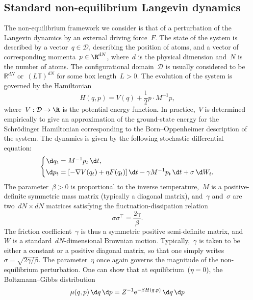 \subsection{Standard non-equilibrium Langevin dynamics}\label{04:subsec:langevin_nemd}
The non-equilibrium framework we consider is that of a perturbation of the Langevin dynamics by an external driving force~$F$. 
The state of the system is described by a vector~$q\in \mathcal D$, describing the position of atoms, and a vector of corresponding momenta~$p\in \R^{dN}$, where~$d$ is the physical dimension and~$N$ is the number of atoms.
The configurational domain~$\mathcal D$ is usually considered to be~$\mathbb{R}^{dN}$ or~$(L\mathbb{T})^{dN}$ for some box length~$L>0$. The evolution of the system is governed by the Hamiltonian \[H(q,p) = V(q) +\frac12 p\cdot M^{-1}p,\]
where~$V:\mathcal D \to \R$ is the potential energy function. In practice,~$V$ is determined empirically to give an approximation of the ground-state energy for the Schr\"odinger Hamiltonian corresponding to the Born--Oppenheimer description of the system.
The dynamics is given by the following stochastic differential equation:
\begin{equation}
    \label{04:eq:langevin_equation}
    \left\{\begin{aligned}
    \d q_t & = M^{-1}p_t\, \d t, \\
    \d p_t &= \left[ -\nabla V(q_t) + \eta F(q_t) \right]\d t -\gamma M^{-1}p_t\,\d t +\sigma\,\d W_t.
    \end{aligned}\right.
\end{equation}
The parameter~$\beta > 0$ is proportional to the inverse temperature,~$M$ is a positive-definite symmetric mass matrix (typically a diagonal matrix), and~$\gamma$ and~$\sigma$ are two~$dN\times dN$ matrices satisfying the fluctuation-dissipation relation 
\[\sigma\sigma^\intercal=\frac{2\gamma}\beta.\]
The friction coefficient~$\gamma$ is thus a symmetric positive semi-definite matrix, and~$W$ is a standard~$dN$-dimensional Brownian motion. Typically,~$\gamma$ is taken to be either a constant or a positive diagonal matrix, so that one simply writes~$\sigma=\sqrt{2\gamma/\beta}$. The parameter~$\eta$ once again governs the magnitude of the non-equilibrium perturbation.
One can show that at equilibrium~($\eta = 0$), the Boltzmann--Gibbs distribution
\begin{equation}
    \label{04:eq:boltzmann_gibbs_measure}
    \mu(q,p)\,\d q\,\d p= Z^{-1}\mathrm{e}^{-\beta H(q,p)}\,\d q\,\d p
\end{equation}
